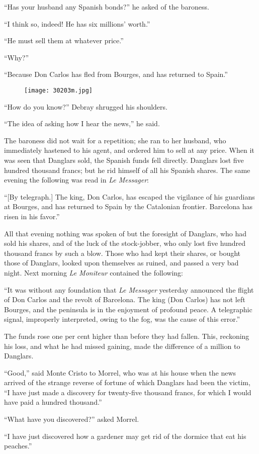 “Has your husband any Spanish bonds?” he asked of the baroness.

“I think so, indeed! He has six millions’ worth.”

“He must sell them at whatever price.”

“Why?”

“Because Don Carlos has fled from Bourges, and has returned to Spain.”

\begin{figure}[ht]
\texttt{[image: 30203m.jpg]}
\end{figure}

“How do you know?” Debray shrugged his shoulders.

“The idea of asking how I hear the news,” he said.

The baroness did not wait for a repetition; she ran to her husband, who
immediately hastened to his agent, and ordered him to sell at any
price. When it was seen that Danglars sold, the Spanish funds fell
directly. Danglars lost five hundred thousand francs; but he rid
himself of all his Spanish shares. The same evening the following was
read in \textit{Le Messager}:

“[By telegraph.] The king, Don Carlos, has escaped the vigilance of his
guardians at Bourges, and has returned to Spain by the Catalonian
frontier. Barcelona has risen in his favor.”

All that evening nothing was spoken of but the foresight of Danglars,
who had sold his shares, and of the luck of the stock-jobber, who only
lost five hundred thousand francs by such a blow. Those who had kept
their shares, or bought those of Danglars, looked upon themselves as
ruined, and passed a very bad night. Next morning \textit{Le Moniteur}
contained the following:

“It was without any foundation that \textit{Le Messager} yesterday announced
the flight of Don Carlos and the revolt of Barcelona. The king (Don
Carlos) has not left Bourges, and the peninsula is in the enjoyment of
profound peace. A telegraphic signal, improperly interpreted, owing to
the fog, was the cause of this error.”

The funds rose one per cent higher than before they had fallen. This,
reckoning his loss, and what he had missed gaining, made the difference
of a million to Danglars.

“Good,” said Monte Cristo to Morrel, who was at his house when the news
arrived of the strange reverse of fortune of which Danglars had been
the victim, “I have just made a discovery for twenty-five thousand
francs, for which I would have paid a hundred thousand.”

“What have you discovered?” asked Morrel.

“I have just discovered how a gardener may get rid of the dormice that
eat his peaches.”
